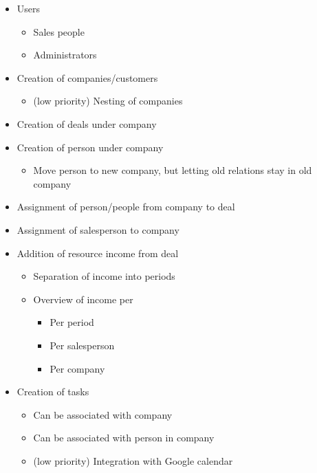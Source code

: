 
\begin{itemize}
  \item Users
  \begin{itemize}
    \item Sales people
    \item Administrators
  \end{itemize}
  \item Creation of companies/customers
  \begin{itemize}
    \item (low priority) Nesting of companies
  \end{itemize}
  \item Creation of deals under company
  \item Creation of person under company
  \begin{itemize}
    \item Move person to new company, but letting old relations stay in old company
  \end{itemize}
  \item Assignment of person/people from company to deal
  \item Assignment of salesperson to company
  \item Addition of resource income from deal
  \begin{itemize}
    \item Separation of income into periods
    \item Overview of income per
    \begin{itemize}
      \item Per period
      \item Per salesperson
      \item Per company
    \end{itemize}
  \end{itemize}
  \item Creation of tasks
  \begin{itemize}
    \item Can be associated with company
    \item Can be associated with person in company
    \item (low priority) Integration with Google calendar
  \end{itemize}
\end{itemize}
